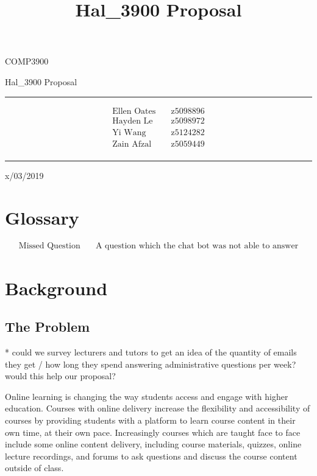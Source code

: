 \documentclass{article}
\title{Hal\_3900 Proposal}
\begin{document}
\begin{LARGE}
\begin{center}
\vspace*{15mm}

COMP3900

Hal\_3900 Proposal

\rule[4.5pt]{0.61\textwidth}{0.3pt}

\begin{align*}
  \text{Ellen Oates}    \quad   &\text{z5098896} \\
  \text{Hayden Le}      \quad   &\text{z5098972} \\
  \text{Yi Wang}        \quad   &\text{z5124282} \\
  \text{Zain Afzal}     \quad   &\text{z5059449} \\
\end{align*}

\rule[4.5pt]{0.61\textwidth}{0.3pt}

x/03/2019

\end{center}
\end{LARGE}
\newpage


\section{Glossary}
\begin{align*}
  \text{Missed Question}    \quad   &\text{A question which the chat bot was not able to answer}
\end{align*}

\section{Background}
\subsection{The Problem}
* could we survey lecturers and tutors to get an idea of the quantity of emails they get / 
how long they spend answering administrative questions per week? would this help our proposal?

Online learning is changing the way students access and engage with higher education. Courses with 
online delivery increase the flexibility and accessibility of courses by providing students
with a platform to learn course content in their own time, at their own pace. Increasingly courses which are 
taught face to face include some online content delivery, including course materials, quizzes, online lecture recordings,
and forums to ask questions and discuss the course content outside of class.   
\end{document}
